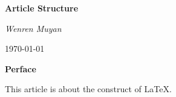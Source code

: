 \begin{titlepage}
    \vspace*{\fill}
    \begin{center}
        \normalfont
        {\Huge\bfseries Article Structure}

        \bigskip
        {\Large\itshape Wenren Muyan}

        \medskip
        \today
    \end{center}

    \vspace*{\fill}

    \begin{center}
        {\huge\bfseries Perface}
        
        \vspace{2em}

        This article is about the construct of LaTeX. 
    \end{center}

    
\end{titlepage}